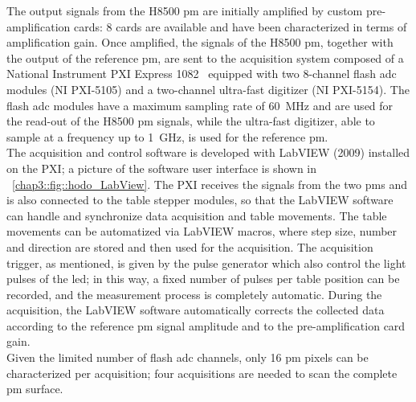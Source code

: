 The output signals from the H8500 \gls{pm} are initially amplified by custom pre-amplification cards: 8 cards are available and have been characterized in terms of amplification gain. Once amplified, the signals of the H8500 \gls{pm}, together with the output of the reference \gls{pm}, are sent to the acquisition system composed of a National Instrument PXI Express 1082~\parencite{NationalInstruments2010} equipped with two 8-channel flash \gls{adc} modules (NI PXI-5105) and a two-channel ultra-fast digitizer (NI PXI-5154). The flash \gls{adc} modules have a maximum sampling rate of 60~MHz and are used for the read-out of the H8500 \gls{pm} signals, while the ultra-fast digitizer, able to sample at a frequency up to 1~GHz, is used for the reference \gls{pm}.\\
The acquisition and control software is developed with LabVIEW (2009) installed on the PXI; a picture of the software user interface is shown in \figurename~\ref{chap3::fig::hodo_LabView}. The PXI receives the signals from the two \glspl{pm} and is also connected to the table stepper modules, so that the LabVIEW software can handle and synchronize data acquisition and table movements. The table movements can be automatized via LabVIEW macros, where step size, number and direction are stored and then used for the acquisition. The acquisition trigger, as mentioned, is given by the pulse generator which also control the light pulses of the \gls{led}; in this way, a fixed number of pulses per table position can be recorded, and the measurement process is completely automatic. During the acquisition, the LabVIEW software automatically corrects the collected data according to the reference \gls{pm} signal amplitude and to the pre-amplification card gain.\\
Given the limited number of flash \gls{adc} channels, only 16 \gls{pm} pixels can be characterized per acquisition; four acquisitions are needed to scan the complete \gls{pm} surface.\\
 
